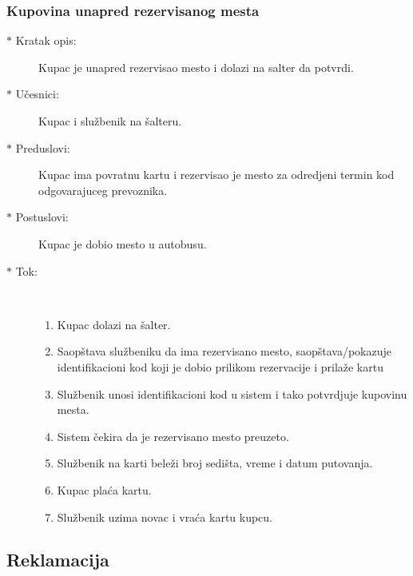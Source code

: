 \subsubsection{Kupovina unapred rezervisanog mesta}
\begin{description}
	\item[$\ast$ Kratak opis: ] Kupac je unapred rezervisao mesto i dolazi na salter da potvrdi.
	\item[$\ast$ U\v cesnici: ] Kupac i slu\v zbenik na \v salteru.
	\item[$\ast$ Preduslovi: ] Kupac ima povratnu kartu i rezervisao je mesto za odredjeni termin kod odgovarajuceg prevoznika.
	\item[$\ast$ Postuslovi: ] Kupac je dobio mesto u autobusu.
	\item[$\ast$ Tok: ] \ \\
	\begin{enumerate}
		\item Kupac dolazi na \v salter.
		\item Saop\v stava slu\v zbeniku da ima rezervisano mesto, saop\v stava/pokazuje identifikacioni kod koji je dobio prilikom rezervacije i prila\v ze kartu
		\item Slu\v zbenik unosi identifikacioni kod u sistem i tako potvrdjuje kupovinu mesta.
		\item Sistem \v cekira da je rezervisano mesto preuzeto.
		\item Slu\v zbenik na karti bele\v zi broj sedi\v sta, vreme i datum putovanja.
		\item Kupac pla\'ca kartu.
		\item Slu\v zbenik uzima novac i vra\'ca kartu kupcu.
	\end{enumerate}
\end{description}

\subsection{Reklamacija}

